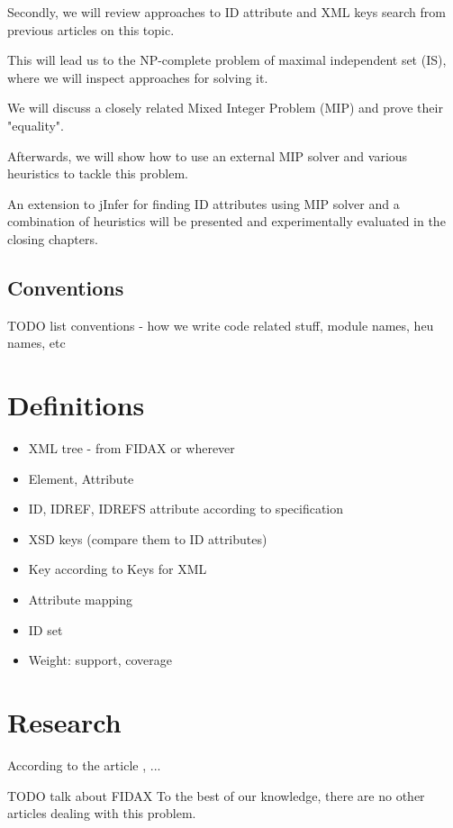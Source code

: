 \documentclass[a4paper,12pt,oneside]{report}
\begin{document}
Secondly, we will review approaches to ID attribute and XML keys search from previous articles on this topic. 

This will lead us to the NP-complete problem of maximal independent set (IS), where we will inspect approaches for solving it.

We will discuss a closely related Mixed Integer Problem (MIP) and prove their "equality".

Afterwards, we will show how to use an external MIP solver and various heuristics to tackle this problem.

An extension to jInfer for finding ID attributes using MIP solver and a combination of heuristics will be presented and experimentally evaluated in the closing chapters.

\section{Conventions}

TODO list conventions - how we write code related stuff, module names, heu names, etc

\chapter{Definitions}

\begin{itemize}
	\item XML tree - from FIDAX or wherever
	\item Element, Attribute
	\item ID, IDREF, IDREFS attribute according to specification
	\item XSD keys (compare them to ID attributes)
	\item Key according to Keys for XML \cite{keX}
	\item Attribute mapping 
	\item ID set
  \item Weight: support, coverage
\end{itemize}

\chapter{Research}

According to the article \cite{fidax}, ...

TODO talk about FIDAX
To the best of our knowledge, there are no other articles dealing with this problem. 
\end{document}
